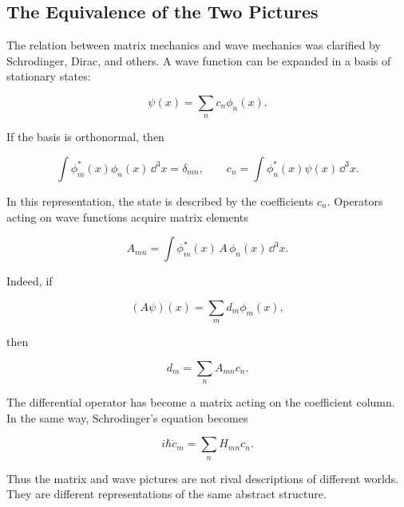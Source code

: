 \subsection{The Equivalence of the Two Pictures}
\label{subsec:equivalence}
The relation between matrix mechanics and wave mechanics was clarified by Schrodinger, Dirac, and others. A wave function can be expanded in a basis of stationary states:
\begin{linenomath}
    \begin{equation}
        \psi(x)=\sum_n c_n\phi_n(x).
    \end{equation}
\end{linenomath}
If the basis is orthonormal, then
\begin{linenomath}
    \begin{equation}
        \int \phi_m^*(x)\phi_n(x)\,\dd^3x=\delta_{mn},
        \qquad
        c_n=\int \phi_n^*(x)\psi(x)\,\dd^3x.
    \end{equation}
\end{linenomath}
In this representation, the state is described by the coefficients $c_n.$ Operators acting on wave functions acquire matrix elements
\begin{linenomath}
    \begin{equation}
        A_{mn}=\int \phi_m^*(x)\,A\,\phi_n(x)\,\dd^3x.
    \end{equation}
\end{linenomath}
Indeed, if
\begin{linenomath}
    \begin{equation}
        (A\psi)(x)=\sum_m d_m\phi_m(x),
    \end{equation}
\end{linenomath}
then
\begin{linenomath}
    \begin{equation}
        d_m=\sum_n A_{mn}c_n.
    \end{equation}
\end{linenomath}
The differential operator has become a matrix acting on the coefficient column. In the same way, Schrodinger's equation becomes
\begin{linenomath}
    \begin{equation}
        i\hbar\dot c_m=\sum_n H_{mn}c_n.
    \end{equation}
\end{linenomath}
Thus the matrix and wave pictures are not rival descriptions of different worlds. They are different representations of the same abstract structure.

